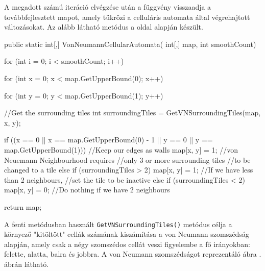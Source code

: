 A megadott számú iteráció elvégzése után a függvény visszaadja a továbbfejlesztett mapot, amely tükrözi a celluláris automata által végrehajtott változásokat. Az alább látható metódus a \cite{mapgenerator} oldal alapján készült.

\begin{java}
public static int[,] VonNeumannCellularAutomata(
    int[,] map, int smoothCount)
{
    for (int i = 0; i < smoothCount; i++)
    {
        for (int x = 0; x < 
            map.GetUpperBound(0); x++)
        {
            for (int y = 0; y < 
                map.GetUpperBound(1); y++)
            {
                //Get the surrounding tiles
                int surroundingTiles = 
                    GetVNSurroundingTiles(map, x, y);

                if ((x == 0 || 
                    x == map.GetUpperBound(0) - 1 || 
                    y == 0 || y == map.GetUpperBound(1)))
                {
                    //Keep our edges as walls
                    map[x, y] = 1; 
                }
                //von Neuemann Neighbourhood requires
                //only 3 or more surrounding tiles
                //to be changed to a tile
                else if (surroundingTiles > 2)
                {
                    map[x, y] = 1;
                }
                //If we have less than 2 neighbours,
                //set the tile to be inactive
                else if (surroundingTiles < 2)
                {
                    map[x, y] = 0;
                }
                //Do nothing if we have 2 neighbours
            }
        }
    }
    return map;
}
\end{java}

A fenti metódusban használt \texttt{GetVNSurroundingTiles()} metódus \cite{mapgenerator} célja a környező "kitöltött" cellák számának kiszámítása a von Neumann szomszédság alapján, amely csak a négy szomszédos cellát veszi figyelembe a fő irányokban: felette, alatta, balra és jobbra. A von Neumann szomszédságot reprezentáló ábra . ábrán látható.

